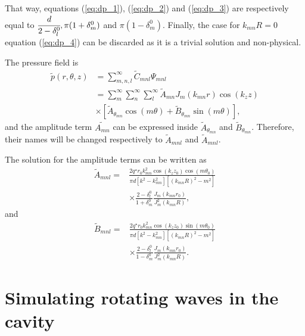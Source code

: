 \documentclass[%
 reprint,
 amsmath,amssymb,
 aip,
]{revtex4-1}
\begin{document}
That way, equations (\ref{eq:dp_1}), (\ref{eq:dp_2}) and (\ref{eq:dp_3})  are respectively equal to $\cfrac{d}{2 - \delta_l^0}, \pi(1 + \delta_m^0)$ and $\pi(1 - \delta_m^0)$. Finally, the case for $k_{mn}R = 0$ equation (\ref{eq:dp_4}) can be discarded as it is a trivial solution and non-physical.

The pressure field is
\begin{equation}
    \begin{split}
        \tilde{p}(r, \theta, z) &= \sum_{m,n,l}^{\infty} \tilde{C}_{mnl} \Psi_{mnl}\\
                                &= \sum_m^{\infty}\sum_n^{\infty}\sum_l^{\infty} \tilde{A}_{mn} J_m(k_{mn}r) \cos(k_z z)\\ &\times \left[ \tilde{A}_{\theta_{mn}} \cos(m \theta) + \tilde{B}_{\theta_{mn}} \sin(m \theta) \right],
    \end{split}
\end{equation}
and the amplitude term $\tilde{A_{mn}}$ can be expressed inside $\tilde{A}_{\theta_{mn}}$ and $\tilde{B}_{\theta_{mn}}$. Therefore, their names will be changed respectively to $\tilde{A}_{mnl}$ and $\tilde{A}_{mnl}$.

The solution for the amplitude terms can be written as 
\begin{equation}
    \begin{split}
        \tilde{A}_{mnl} = &\frac{2 q^{\star} r_0 k^2_{mn} \cos(k_z z_0) \cos(m \theta_0)}{\pi d\left[k^2 - k^2_{mn}\right] \left[(k_{mn}R)^2 - m^2 \right]}\\  &\times \frac{2 - \delta_l^0}{1 + \delta_m^0} \frac{J_m(k_{mn}r_0)}{J^2_{m}(k_{mn}R)},
    \end{split}
\end{equation}
and
\begin{equation}
    \begin{split}
        \tilde{B}_{mnl} = &\frac{2 q^{\star} r_0 k^2_{mn} \cos(k_z z_0) \sin(m \theta_0)}{\pi d\left[k^2 - k^2_{mn}\right] \left[(k_{mn}R)^2 - m^2 \right]}\\  &\times \frac{2 - \delta_l^0}{1 - \delta_m^0} \frac{J_m(k_{mn}r_0)}{J^2_{m}(k_{mn}R)}.
    \end{split}
\end{equation}

\section{Simulating rotating waves in the cavity}
\end{document}
